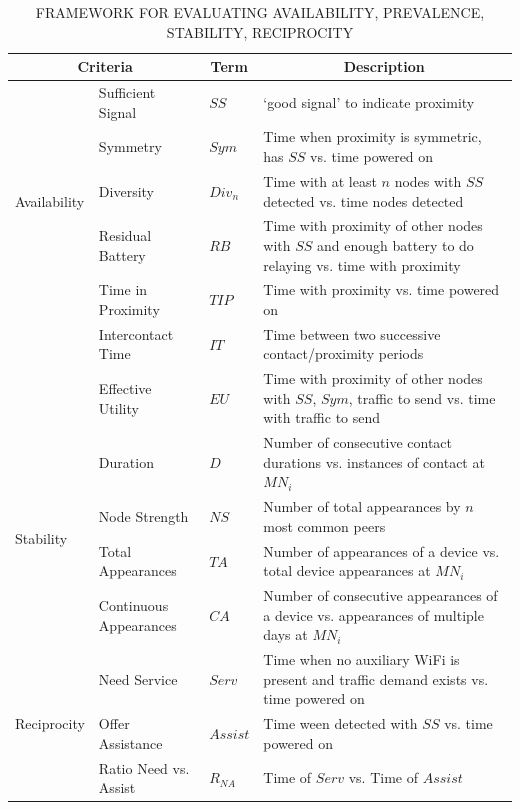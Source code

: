 \begin{landscape}
\begin{table}[t] 
\caption{FRAMEWORK FOR EVALUATING AVAILABILITY, PREVALENCE, STABILITY, RECIPROCITY} 
\centering
\begin{tabular}{l|p{3.5cm}|p{1.5cm}|p{11cm}}
\hline
\multicolumn{2}{c|}{Criteria} & \multicolumn{1}{c|}{Term} &\multicolumn{1}{c}{Description}  \\ 				
\hline
\hline  
\multirow{5}{*}{Availability}   & Sufficient Signal & $SS$ 	& `good signal' to indicate proximity  \\ 
\cline{2-4}		 			  & Symmetry & $Sym$		& Time when proximity is symmetric, has $SS$ vs. time powered on \\
\cline{2-4}		  		           & Diversity & $Div_n$	         & Time with at least $n$ nodes with $SS$ detected vs. time nodes detected \\ 
\cline{2-4}					  & Residual Battery & $RB$	& Time with proximity of other nodes with $SS$ and enough battery to do relaying vs. time with proximity \\

\hline  
\multirow{2}{*}{Prevalence}   & Time in Proximity & $TIP$ 	& Time with proximity vs. time powered on  \\ 
\cline{2-4}					  & Intercontact Time & $IT$	& Time between two successive contact/proximity periods \\
\cline{2-4}					  & Effective Utility & $EU$	& Time with proximity of other nodes with $SS$, $Sym$, traffic to send vs. time with traffic to send \\

\hline \multirow{4}{*}{Stability} 		& Duration & $D$			& Number of consecutive contact durations vs. instances of contact at $MN_i$ \\
\cline{2-4}			     			&  Node Strength & $NS$	&  Number of total appearances by $n$ most common peers \\
\cline{2-4}			     			&  Total Appearances & $TA$	& Number of appearances of a device vs. total device appearances at $MN_i$ \\
\cline{2-4}			     			&  Continuous Appearances & $CA$	& Number of consecutive appearances of a device vs. appearances of multiple days at $MN_i$ \\
\hline \multirow{4}{*}{Reciprocity}  & Need Service & $Serv$ & Time when no auxiliary WiFi is present and traffic demand exists vs. time powered on\\
\cline{2-4}	  		       		 & Offer Assistance & $Assist$ & Time ween detected with $SS$ vs. time powered on 	\\
\cline{2-4}					 & Ratio Need vs. Assist & $R_{NA}$ & Time of $Serv$ vs. Time of $Assist$ \\ 
\hline
\end{tabular}
\label{table:metrics} 
\end{table}
\end{landscape}

